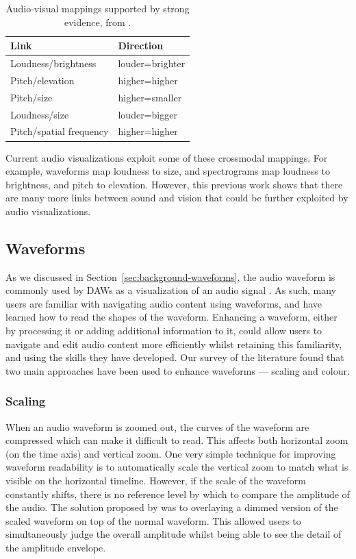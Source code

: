 \begin{table}[h]
\centering
\begin{tabular}{l l}
\hline
\textbf{Link} & \textbf{Direction} \\
\hline
Loudness/brightness  & louder=brighter \\
Pitch/elevation & higher=higher \\
Pitch/size & higher=smaller \\
Loudness/size & louder=bigger \\
Pitch/spatial frequency & higher=higher \\
\hline
\end{tabular}
\caption{Audio-visual mappings supported by strong evidence, from \citet{Spence2011}.}
\label{tab:crossmodal}
\end{table}









Current audio visualizations exploit some of these crossmodal mappings. For example, waveforms map loudness to size,
and spectrograms map loudness to brightness, and pitch to elevation. However, this previous work shows that there are
many more links between sound and vision that could be further exploited by audio visualizations.

\subsection{Waveforms}\label{sec:background-waveforms-related}

As we discussed in Section~\ref{sec:background-waveforms}, the audio waveform is commonly used by DAWs as a
visualization of an audio signal \citep{Derry2002}.  As such, many users are familiar with navigating audio content
using waveforms, and have learned how to read the shapes of the waveform.
Enhancing a waveform, either by processing it or adding additional information to it, could allow users to
navigate and edit audio content more efficiently whilst retaining this familiarity, and using the skills they have
developed. Our survey of the literature found that two main approaches have been used to enhance waveforms --- scaling
and colour.

\subsubsection{Scaling}
When an audio waveform is zoomed out, the curves of the waveform are compressed which can make it difficult to read.
This affects both horizontal zoom (on the time axis) and vertical zoom.
One very simple technique for improving waveform readability is to automatically scale the vertical zoom to match what
is visible on the horizontal timeline.  However, if the scale of the waveform constantly shifts, there is no reference
level by which to compare the amplitude of the audio.  The solution proposed by \citet[p. 39]{Goudeseune2012} was to
overlaying a dimmed version of the scaled waveform on top of the normal waveform. This allowed users to simultaneously
judge the overall amplitude whilst being able to see the detail of the amplitude envelope.

